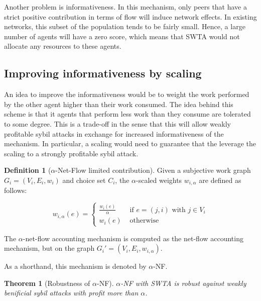 \documentclass[a4paper,11pt]{book}
\newtheorem{theorem}{Theorem}
\theoremstyle{definition}
\newtheorem{definition}{Definition}
\begin{document}
Another problem is informativeness. In this mechanism,
only peers that have a strict positive contribution in terms of flow will induce network effects.
In existing networks, this subset of the population tends to be fairly small. Hence, a large
number of agents will have a zero score, which means that SWTA would not allocate any resources
to these agents.

\subsection{Improving informativeness by scaling}
An idea to improve the informativeness would be to weight the work performed by the other
agent higher than their work consumed. The idea behind this scheme is that it agents
that perform less work than they consume are tolerated to some degree. This is a trade-off
in the sense that this will allow weakly profitable sybil attacks in exchange for increased
informativeness of the mechanism. In particular, a scaling would need to guarantee
that the leverage the scaling to a strongly profitable sybil attack. 

\begin{definition}[$\alpha$-Net-Flow limited contribution]
    Given a subjective work graph $G_i = (V_i, E_i, w_i)$ and choice set $C_i$, the $\alpha$-scaled
    weights $w_{i,\alpha}$ are defined as follows:

    \begin{equation*}
        w_{i,\alpha}(e) = 
        \begin{cases}
            \frac{w_i(e)}{\alpha} &\mbox{ if } e = (j, i) \mbox{ with } j \in V_i \\
            w_i(e) &\mbox{ otherwise}
        \end{cases}
    \end{equation*}
    
    The $\alpha$-net-flow accounting mechanism is computed as the net-flow accounting
    mechanism, but on the graph $G_i' = (V_i, E_i, w_{i,\alpha})$.

    As a shorthand, this mechanism is denoted by $\alpha$-NF.
\end{definition}

\begin{theorem}[Robustness of $\alpha$-NF]
    $\alpha$-NF with SWTA is robust against weakly benificial sybil attacks with
    profit more than $\alpha$.
    \label{thm:sybil-anf}
\end{theorem}
\end{document}
